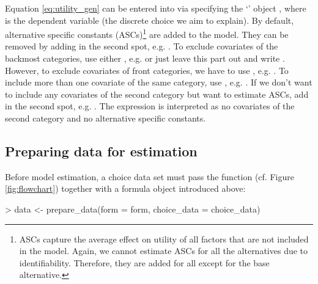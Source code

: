 \documentclass[article]{jss}
\newcommand{\class}[1]{`\code{#1}'}
\newcommand{\fct}[1]{\code{#1()}}
\begin{document}
Equation \eqref{eq:utility_gen} can be entered into  via specifying the \class{formula} object , where  is the dependent variable (the discrete choice we aim to explain). By default, alternative specific constants (ASCs)\footnote{ASCs capture the average effect on utility of all factors that are not included in the model. Again, we cannot estimate ASCs for all the alternatives due to identifiability. Therefore, they are added for all except for the base alternative.} are added to the model. They can be removed by adding  in the second spot, e.g. . To exclude covariates of the backmost categories, use either , e.g.  or just leave this part out and write . However, to exclude covariates of front categories, we have to use , e.g. . To include more than one covariate of the same category, use \code{+}, e.g. . If we don't want to include any covariates of the second category but want to estimate ASCs, add  in the second spot, e.g. . The expression  is interpreted as no covariates of the second category and no alternative specific constants.

\subsection{Preparing data for estimation} \label{subsec:prepare_data}

Before model estimation, a choice data set  must pass the \fct{prepare\_data} function (cf. Figure \ref{fig:flowchart}) together with a formula object  introduced above:

\begin{Schunk}
\begin{Sinput}
> data <- prepare_data(form = form, choice_data = choice_data)
\end{Sinput}
\end{Schunk}
\end{document}
